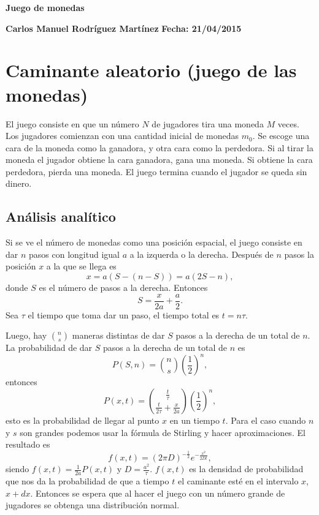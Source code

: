\documentclass[letterpaper,11pt]{article}
\begin{document}
\begin{center}
{\bf \Large Juego de monedas} 
\end{center}

\noindent
{\bf \large Carlos Manuel Rodríguez Martínez} \hspace{5.2cm} {\bf \large Fecha: 21/04/2015} 

\smallskip

\section*{Caminante aleatorio (juego de las monedas)}
El juego consiste en que un número $N$ de jugadores tira una moneda $M$ veces. Los jugadores comienzan con una cantidad inicial de monedas $m_0$. Se escoge una cara de la moneda como la ganadora, y otra cara como la perdedora. Si al tirar la moneda el jugador obtiene la cara ganadora, gana una moneda. Si obtiene la cara perdedora, pierda una moneda. El juego termina cuando el jugador se queda sin dinero.

\subsection*{Análisis analítico}
Si se ve el número de monedas como una posición espacial, el juego consiste en dar $n$ pasos con longitud igual $a$ a la izquerda o la derecha. Después de $n$ pasos la posición $x$ a la que se llega es
\[
	x = a \left(S-(n-S) \right) = a(2S-n),
\]
donde $S$ es el número de pasos a la derecha. Entonces
\[
	S = \frac{x}{2a}+\frac{a}{2}.
\]
Sea $\tau$ el tiempo que toma dar un paso, el tiempo total es $t = n \tau$.

Luego, hay $n \choose s$ maneras distintas de dar $S$ pasos a la derecha de un total de $n$. La probabilidad de dar $S$ pasos a la derecha de un total de $n$ es
\[
	P(S,n) = {n \choose s} \left( \frac{1}{2} \right)^n,
\]
entonces
\[
	P(x,t) = {\frac{t}{\tau} \choose \frac{t}{2 \tau} + \frac{x}{2a}} \left( \frac{1}{2} \right)^n,
\]
esto es la probabilidad de llegar al punto $x$ en un tiempo $t$. Para el caso cuando $n$ y $s$ son grandes podemos usar la fórmula de Stirling y hacer aproximaciones. El resultado es
\[
	f(x,t) = (2 \pi D)^{-\frac{1}{2}} e^{- \frac{x^2}{2 D t}},
\]
siendo $f(x,t) = \frac{1}{2a} P(x,t)$ y $D = \frac{a^2}{\tau}$. $f(x,t)$ es la densidad de probabilidad que nos da la probabilidad de que a tiempo $t$ el caminante esté en el intervalo $x$, $x+dx$.
Entonces se espera que al hacer el juego con un número grande de jugadores se obtenga una distribución normal.
\end{document}

